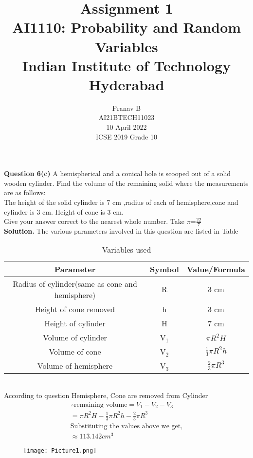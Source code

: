 \documentclass[journal,12pt,twocolumn]{IEEEtran}
\title{Assignment 1 \\ \Large AI1110: Probability and Random Variables \\ \large Indian Institute of Technology Hyderabad}
\author{Pranav B \\ \normalsize AI21BTECH11023 \\ \vspace*{20pt} \normalsize  10 April 2022 \\ \vspace*{20pt} \Large ICSE 2019 Grade 10}
\begin{document}
	\maketitle
	
	\textbf{Question 6(c)} 
	A hemispherical and a conical hole is scooped out of a solid wooden cylinder. Find the volume of the remaining solid where the measurements are as follows:\\
	The height of the solid cylinder is 7 cm ,radius of each of hemisphere,cone and cylinder is 3 cm. Height of cone is 3 cm.\\
	Give your answer correct to the nearest whole number. Take $\pi$=$\frac{22}{7}$\\
	\textbf{Solution.}
	The various parameters involved in this question are listed in Table\\ \begin{table}[h]
\caption{Variables used}
\begin{tabular}{|c |c|c|}
\hline 
\textbf{Parameter} & \textbf{Symbol} & \textbf{Value/Formula}\\
\hline
Radius of cylinder(same as cone and hemisphere) & R & 3 cm\\
\hline
Height of cone removed & h & 3 cm\\
\hline
Height of cylinder & H & 7 cm\\
\hline
Volume of cylinder & V$_1$ & $\pi R^2 H$\\
\hline
Volume of cone  & V$_2$ & $\frac{1}{3} \pi R^2 h$\\
\hline
Volume of hemisphere & V$_3$ & $\frac{2}{3} \pi R^3$\\
\hline
\end{tabular}
\end{table}
\\
According to question Hemisphere, Cone are removed from Cylinder\\
\begin{align}
\therefore \text{remaining volume} = V_1-V_2-V_3
\nonumber
\\
=\pi R^2 H - \frac{1}{3} \pi R^2 h - \frac{2}{3} \pi R^3
\nonumber
\\
\text{Substituting the values above  we get,}
\nonumber
\\
\approx113.142 cm^3
\nonumber
\end{align}
\begin{figure}[ht!]
\begin{flushright}
\texttt{[image: Picture1.png]}
\end{flushright}
\end{figure}		
\end{document}
